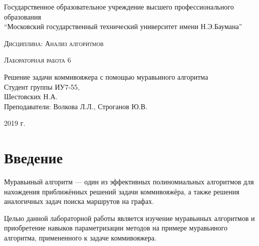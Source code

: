 \documentclass[a4paper, 14pt]{article}
\begin{document}
    \begin{titlepage}

        \begin{center}
            \large
            Государственное образовательное учреждение высшего профессионального образования\\
            “Московский государственный технический университет имени Н.Э.Баумана”
            \vspace{3cm}
            
            \textsc{Дисциплина: Анализ алгоритмов}
            \vspace{0.5cm}
                
            \textsc{Лабораторная работа 6}
            \vspace{1.5cm}
            
            {\LARGE Решение задачи коммивояжера с помощью муравьиного алгоритма\\}
            \vspace{1.5cm}
            Студент группы ИУ7-55,\\   
            Шестовских Н.А.\\
            Преподаватели: Волкова Л.Л., Строганов Ю.В.
            \vfill
            
            2019 г.
            
            \end{center}

    \end{titlepage}
    \setcounter{page}{2}
\tableofcontents
	
	\newpage
	
        \section*{Введение}
        
        
        \parindent=1cm
        
        
        Муравьиный алгоритм — один из эффективных полиномиальных алгоритмов для нахождения приближённых решений задачи коммивояжёра, а также решения аналогичных задач поиска маршрутов на графах.
        
        Целью данной лабораторной работы является изучение муравьиных алгоритмов и приобретение навыков параметризации методов на примере муравьиного алгоритма, примененного к задаче коммивояжера.
        
\end{document}
